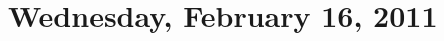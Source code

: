 \documentclass [letterpaper,11pt,twoside] {article}
\begin{document}
\setcounter {section}{5}\section {Wednesday, February 16, 2011}
\end{document}
